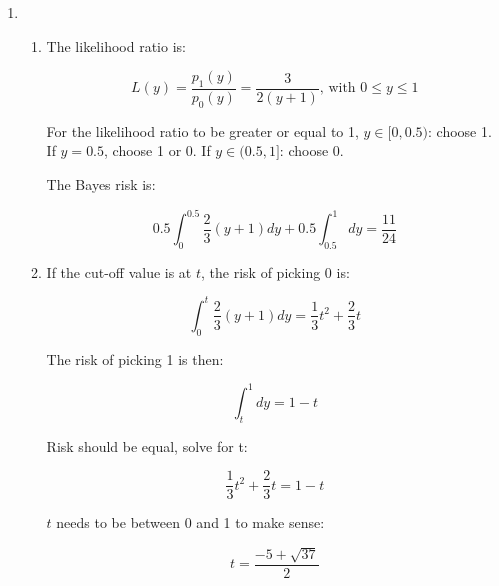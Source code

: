 \documentclass[11pt,letterpaper,titlepage]{article}
\begin{document}
\begin{enumerate}
    
    \item %
    
    \begin{enumerate}
        
        \item %
        
        The likelihood ratio is:
        
        \begin{equation*}
            L(y) = \frac{p_1(y)}{p_0(y)} = \frac{3}{2(y+1)} \text{, with } 0 \leq y \leq 1
        \end{equation*}
        
        For the likelihood ratio to be greater or equal to 1, $y \in [0, 0.5)$: choose 1. If $y = 0.5$, choose 1 or 0. If $y \in (0.5, 1]$: choose 0.
        
        The Bayes risk is:
        
        \begin{equation*}
            0.5 \int_0^{0.5} \frac{2}{3}(y + 1)dy + 0.5 \int_{0.5}^1 dy = \frac{11}{24}
        \end{equation*}
        
        \item %
        
        If the cut-off value is at $t$, the risk of picking 0 is:
        
        \begin{equation*}
            \int_0^t \frac{2}{3}(y + 1) dy = \frac{1}{3} t^2 + \frac{2}{3} t
        \end{equation*}
        
        The risk of picking 1 is then:
        
        \begin{equation*}
            \int_t^1 dy = 1 - t
        \end{equation*}
        
        Risk should be equal, solve for t:
        
        \begin{equation*}
            \frac{1}{3} t^2 + \frac{2}{3} t = 1 - t
        \end{equation*}
        
        $t$ needs to be between 0 and 1 to make sense:
        
        \begin{equation*}
            t = \frac{-5 + \sqrt{37}}{2}
        \end{equation*}
        

\end{enumerate}
\end{enumerate}
\end{document}
